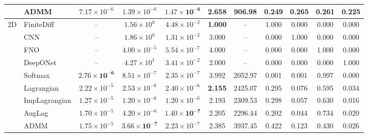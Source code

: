 \documentclass[preprint,12pt,authoryear]{elsarticle}
\begin{document}
\begin{table}[tbp]
{\begin{tabular}{@{}ll ccc ccc ccc@{}}
                    & ADMM   & $7.17 \times 10^{-6}$ & $1.39 \times 10^{-6}$ & $\mathbf{1.47 \times 10^{-6}}$ & 2.658 & 906.98 & 0.249 & 0.265 & 0.261 & 0.225 \\
\midrule
\multirow{9}{*}{2D} & FiniteDiff & -- & $1.56 \times 10^{0}$ & $4.48 \times 10^{-2}$ & \textbf{1.000} & -- & 1.000 & 0.000 & 0.000 & 0.000 \\
                    & CNN        & -- & $1.86 \times 10^{0}$ & $1.31 \times 10^{-2}$ & 3.000 & -- & 0.000 & 1.000 & 0.000 & 0.000 \\
                    & FNO        & -- & $4.00 \times 10^{-5}$ & $5.54 \times 10^{-7}$ & 4.000 & -- & 0.000 & 0.000 & 1.000 & 0.000 \\
                    & DeepONet   & -- & $4.27 \times 10^{1}$ & $3.41 \times 10^{-2}$ & 2.000 & -- & 0.000 & 0.000 & 0.000 & 1.000 \\
\cmidrule(lr){2-11} & Softmax    & $\mathbf{2.76 \times 10^{-6}}$ & $8.51 \times 10^{-7}$ & $2.35 \times 10^{-7}$ & 3.992 & 2052.97 & 0.001 & 0.001 & 0.997 & 0.000 \\
                    & Lagrangian & $2.22 \times 10^{-5}$ & $2.53 \times 10^{-6}$ & $2.40 \times 10^{-6}$ & \textbf{2.155} & 2425.07 & 0.295 & 0.076 & 0.595 & 0.034 \\
                    
                    & ImpLagrangian     & $1.27 \times 10^{-5}$ & $1.20 \times 10^{-6}$ & $1.20 \times 10^{-6}$ & 2.193 & 2309.53 & 0.298 & 0.057 & 0.630 & 0.016 \\
                    & AugLag & $1.70 \times 10^{-5}$ & $4.20 \times 10^{-6}$ & $\mathbf{1.40 \times 10^{-7}}$ & 2.205 & 2296.44 & 0.202 & 0.044 & 0.734 & 0.020 \\
                    & ADMM   & $1.75 \times 10^{-5}$ & $\mathbf{3.66 \times 10^{-7}}$ & $2.23 \times 10^{-7}$ & 2.385 & 3937.45 & 0.422 & 0.123 & 0.430 & 0.026 \\
\bottomrule
\end{tabular}
}
\end{table}
\end{document}
